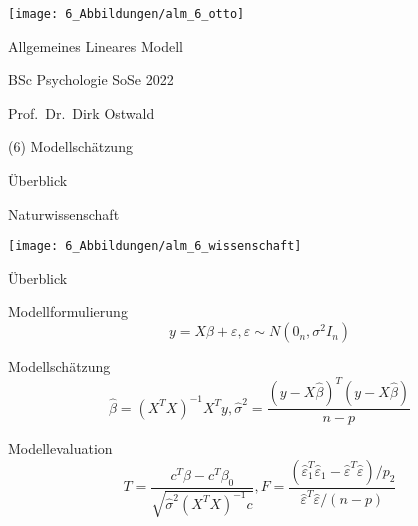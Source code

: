 \documentclass[
  8pt,
  ignorenonframetext,
]{beamer}
\author{}
\date{\vspace{-2.5em}}
\begin{document}
\begin{frame}[plain]{}
\protect\hypertarget{section}{}
\center

\begin{center}\texttt{[image: 6\_Abbildungen/alm\_6\_otto]} \end{center}

\vspace{2mm}

\huge

Allgemeines Lineares Modell \vspace{6mm}

\large

BSc Psychologie SoSe 2022

\vspace{6mm}
\normalsize

Prof.~Dr.~Dirk Ostwald
\end{frame}

\begin{frame}[plain]{}
\protect\hypertarget{section-1}{}
\center
\huge
\vfill

\noindent (6) Modellschätzung \vfill
\end{frame}

\begin{frame}{Überblick}
\protect\hypertarget{uxfcberblick}{}
\large

Naturwissenschaft \vspace{7mm}

\begin{center}\texttt{[image: 6\_Abbildungen/alm\_6\_wissenschaft]} \end{center}
\end{frame}

\begin{frame}{Überblick}
\protect\hypertarget{uxfcberblick-1}{}
\vspace{1mm}
\normalsize

Modellformulierung \vspace{1mm} \small \begin{equation}
y = X\beta + \varepsilon, \varepsilon \sim N(0_n,\sigma^2I_n)
\end{equation} \vspace{5mm}

\normalsize

Modellschätzung \small \begin{equation}
\hat{\beta} = (X^TX)^{-1} X^Ty,  \hat{\sigma}^2 = \frac{(y - X\hat{\beta})^T(y - X\hat{\beta})}{n-p}
\end{equation} \vspace{4mm}

\normalsize

Modellevaluation \small \begin{equation}
T = \frac{c^T\hat{\beta} - c^T\beta_0}{\sqrt{\hat{\sigma}^2(X^TX)^{-1}c}}, 
F = \frac{(\hat{\varepsilon}_1^T\hat{\varepsilon}_1 - \hat{\varepsilon}^T\hat{\varepsilon})/p_2}{\hat{\varepsilon}^T\hat{\varepsilon}/(n-p)}
\end{equation}
\end{frame}
\end{document}
